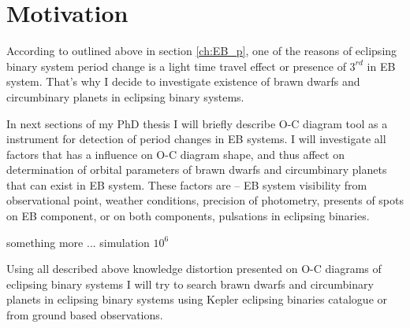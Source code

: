 \chapter{Motivation}

According to outlined above in section \ref{ch:EB_p}, one of the reasons of eclipsing binary system period change is a light time travel effect or presence of $3^{rd}$ in EB system. That's why I decide to investigate existence of brawn dwarfs and circumbinary planets in eclipsing binary systems.

In next sections of my PhD thesis I will briefly describe O-C diagram tool as a instrument for detection of period changes in EB systems. 
I will investigate all factors that has a influence on O-C diagram shape, and thus affect on determination of orbital parameters of brawn dwarfs and circumbinary planets that can exist in EB system.
These factors are -- EB system visibility from observational point, weather conditions, precision of photometry, presents of spots on EB component, or on both components, pulsations in eclipsing binaries.

something more ... simulation  $10^6$   


Using all described above knowledge distortion presented on O-C diagrams of eclipsing binary systems I will try to search brawn dwarfs and circumbinary planets in eclipsing binary systems using Kepler eclipsing binaries catalogue or from ground based observations.  
